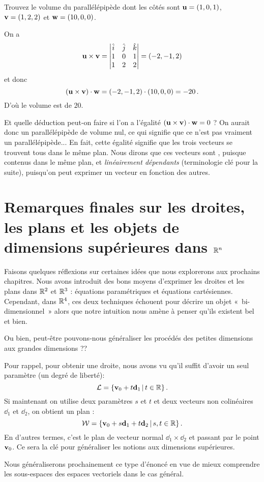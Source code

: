 \begin{myprob}
Trouvez le volume du parallélépipède dont les côtés sont $\mathbf{u} = (1,0,1)$,
$\mathbf{v} = (1,2,2)$ et $\mathbf{w} = (10,0,0)$.

\begin{mysol}
On a
$$
\mathbf{u} \times \mathbf{v} =  \left| \begin{matrix}
\hat{i} & \hat{j} & \hat{k} \\
1 & 0 & 1\\
1 & 2 & 2 \end{matrix} \right| 
= (-2,-1,2)
$$
et donc
$$
(\mathbf{u} \times \mathbf{v})\cdot \mathbf{w} = (-2,-1,2)\cdot (10,0,0) = -20\,.
$$
D'o\`u le volume est de $20$.
\end{mysol}\end{myprob}

Et quelle déduction peut-on faire si l'on a l'égalité $(\mathbf{u} \times \mathbf{v})\cdot \mathbf{w} = 0$ ?  
On aurait donc un parallélépipède de volume nul, ce qui signifie que ce n'est pas vraiment un parallélépipède...
En fait, cette égalité signifie que les trois vecteurs se trouvent tous dans le même plan. Nous
dirons que ces vecteurs sont , puisque contenus dans le même plan, et \emph{linéairement dépendants} (terminologie clé pour la suite), puisqu'on peut exprimer un vecteur en fonction des autres.





\section[Remarques finales: les droites, les plans, et plus encore]{Remarques finales sur les droites, les plans et les objets de dimensions supérieures dans \texorpdfstring{$\mathbb{R}^n$}{Rn}}

Faisons quelques réflexions sur certaines idées
que nous explorerons aux prochains chapitres.  Nous avons introduit
des bons moyens d'exprimer les droites et les plans dans $\mathbb{R}^2$ et $\mathbb{R}^3$ : équations paramétriques et équations cartésiennes. Cependant, dans $\mathbb{R}^4$, ces deux techniques échouent pour décrire un objet «~bi-dimensionnel~» alors que notre intuition nous amène à penser qu'ils existent bel et bien.

Ou bien, peut-être pouvons-nous généraliser les procédés des petites dimensions aux grandes dimensions ?\!?

Pour rappel, pour obtenir une droite, nous avons vu qu'il suffit d'avoir un seul paramètre (un degré de liberté): 
$$
\mathcal L = \{ \mathbf{v}_0+ t\mathbf{d}_1 \,|\, t\in\mathbb{R}\}\,.
$$
Si maintenant on utilise deux paramètres $s$ et $t$ et deux vecteurs non colinéaires $\dd_1$ et $\dd_2$, on obtient un plan :
$$
\mathcal W = \{ \mathbf{v}_0 + s\mathbf{d}_1 + t\mathbf{d}_2 \,|\, s,t\in\mathbb{R}\}\,.
$$
En d'autres termes, c'est le plan de vecteur normal $\dd_1 \times \dd_2$ et passant par le point $\mathbf{v}_0$. Ce sera la clé pour généraliser les notions aux dimensions supérieures.

Nous généraliserons prochainement ce type d'énoncé en vue de mieux comprendre les sous-espaces des espaces vectoriels dans le cas général.



